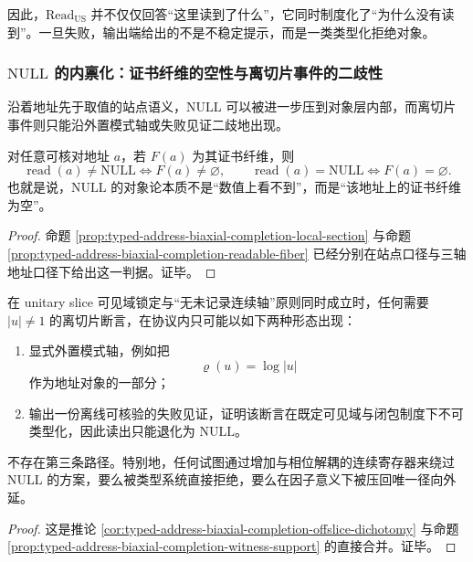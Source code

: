 因此，\(\mathrm{Read}_{\mathrm{US}}\) 并不仅仅回答“这里读到了什么”，它同时制度化了“为什么没有读到”。一旦失败，输出端给出的不是不稳定提示，而是一类类型化拒绝对象。

\subsubsection{\texorpdfstring{$\mathrm{NULL}$}{NULL} 的内禀化：证书纤维的空性与离切片事件的二歧性}\label{subsubsec:typed-address-biaxial-completion-null-fiber-dichotomy}
沿着地址先于取值的站点语义，\(\mathrm{NULL}\) 可以被进一步压到对象层内部，而离切片事件则只能沿外置模式轴或失败见证二歧地出现。

\begin{proposition}\label{prop:typed-address-biaxial-completion-null-fiber}
对任意可核对地址 \(a\)，若 \(F(a)\) 为其证书纤维，则
\[
\operatorname{read}(a)\neq \mathrm{NULL}
\iff
F(a)\neq\varnothing,
\qquad
\operatorname{read}(a)=\mathrm{NULL}
\iff
F(a)=\varnothing.
\]
也就是说，\(\mathrm{NULL}\) 的对象论本质不是“数值上看不到”，而是“该地址上的证书纤维为空”。
\end{proposition}
\begin{proof}
命题 \ref{prop:typed-address-biaxial-completion-local-section} 与命题 \ref{prop:typed-address-biaxial-completion-readable-fiber} 已经分别在站点口径与三轴地址口径下给出这一判据。证毕。
\end{proof}

\begin{corollary}[离切片事件的协议二歧性]\label{cor:typed-address-biaxial-completion-visible-null-dichotomy}
在 unitary slice 可见域锁定与“无未记录连续轴”原则同时成立时，任何需要 \(|u|\neq 1\) 的离切片断言，在协议内只可能以如下两种形态出现：
\begin{enumerate}
  \item 显式外置模式轴，例如把
  \[
  \varrho(u)=\log|u|
  \]
  作为地址对象的一部分；
  \item 输出一份离线可核验的失败见证，证明该断言在既定可见域与闭包制度下不可类型化，因此读出只能退化为 \(\mathrm{NULL}\)。
\end{enumerate}
不存在第三条路径。特别地，任何试图通过增加与相位解耦的连续寄存器来绕过 \(\mathrm{NULL}\) 的方案，要么被类型系统直接拒绝，要么在因子意义下被压回唯一径向外延。
\end{corollary}
\begin{proof}
这是推论 \ref{cor:typed-address-biaxial-completion-offslice-dichotomy} 与命题 \ref{prop:typed-address-biaxial-completion-witness-support} 的直接合并。证毕。
\end{proof}

